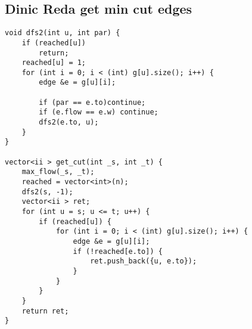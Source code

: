 \documentclass{article}
\begin{document}
\subsection{Dinic Reda get min cut edges}
\begin{verbatim}
void dfs2(int u, int par) {  
    if (reached[u])  
        return;  
    reached[u] = 1;  
    for (int i = 0; i < (int) g[u].size(); i++) {  
        edge &e = g[u][i];  
  
        if (par == e.to)continue;  
        if (e.flow == e.w) continue;  
        dfs2(e.to, u);  
    }  
}  
  
vector<ii > get_cut(int _s, int _t) {  
    max_flow(_s, _t);
    reached = vector<int>(n);  
    dfs2(s, -1);  
    vector<ii > ret;  
    for (int u = s; u <= t; u++) {  
        if (reached[u]) {  
            for (int i = 0; i < (int) g[u].size(); i++) {  
                edge &e = g[u][i];  
                if (!reached[e.to]) {  
                    ret.push_back({u, e.to});  
                }  
            }  
        }  
    }  
    return ret;  
}
\end{verbatim}
\end{document}
